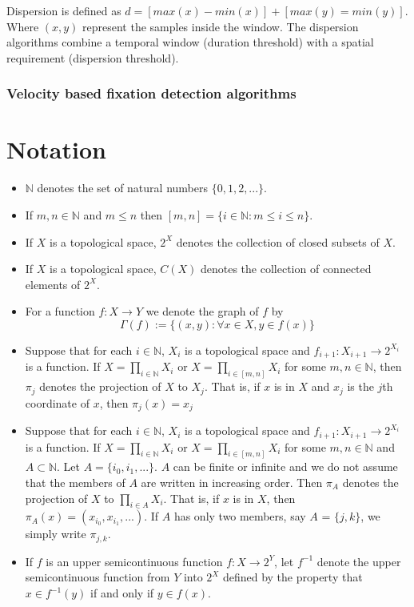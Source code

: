 \documentclass[12pt]{article}
\theoremstyle{definition}
\begin{document}
Dispersion is defined as $d = [max(x) - min(x)] + [max(y) = min(y)]$. Where $(x,y)$ represent the samples inside the window. The dispersion algorithms combine a temporal window (duration threshold) with a spatial requirement (dispersion threshold).

\subsubsection{Velocity based fixation detection algorithms}




\newpage
\section{Notation}
\begin{itemize}

\item $\mathbb{N}$ denotes the set of natural numbers $\lbrace 0, 1, 2, ... \rbrace$.
\item If $m, n \in \mathbb{N}$ and $m \leq n$ then $[m,n] = \lbrace i \in \mathbb{N}:m \leq i \leq n \rbrace$.
\item If $X$ is a topological space, $2^X$ denotes the collection of closed subsets of $X$. 
\item If $X$ is a topological space, $C(X)$ denotes the collection of connected elements of $2^X$.
\item For a function $f: X \to Y$ we denote the graph of $f$ by
\[ \Gamma(f) := \lbrace (x,y) : \forall x \in X, y \in f(x) \rbrace \]

\item Suppose that for each $i \in \mathbb{N}$, $X_i$ is a topological space and $f_{i+1}: X_{i+1} \to 2^{X_i}$ is a function. If $X = \prod _{i \in \mathbb{N}} X_i$ or $X = \prod _{i \in [m,n]} X_i$ for some $m, n \in \mathbb{N}$, then $\pi_j$ denotes the projection of $X$ to $X_j$. That is, if $x$ is in $X$ and $x_j$ is the $j$th coordinate of $x$, then $\pi_j(x) = x_j$

\item Suppose that for each $i \in \mathbb{N}$, $X_i$ is a topological space and $f_{i+1}: X_{i+1} \to 2^{X_i}$ is a function. If $X = \prod _{i \in \mathbb{N}} X_i$ or $X = \prod _{i \in [m,n]} X_i$ for some $m, n \in\mathbb{N}$ and $A \subset \mathbb{N}$. Let $A = \lbrace i_0, i_1, ... \rbrace$. $A$ can be finite or infinite and we do not assume that the members of $A$ are written in increasing order. Then $\pi_A$ denotes the projection of $X$ to  $\prod _{i \in A} X_i$. That is, if $x$ is in $X$, then $\pi_A(x) = (x_{i_{0}}, x_{i_{1}}, ... )$. If $A$ has only two members, say $A$ = $\lbrace j , k \rbrace$, we simply write $\pi_{j, k}$.

\item If $f$ is an upper semicontinuous function $f: X \to 2^Y$, let $f^{-1}$ denote the upper semicontinuous function from $Y$ into $2^X$ defined by the property that $x \in f^{-1}(y)$ if and only if $y \in f(x)$.


\end{itemize}
\newpage
\end{document}
